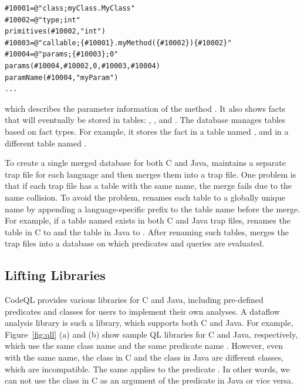 \begin{lstlisting}[style=java,numbers=none]
#10001=@"class;myClass.MyClass"
#10002=@"type;int"
primitives(#10002,"int")
#10003=@"callable;{#10001}.myMethod({#10002}){#10002}"
#10004=@"params;{#10003};0"
params(#10004,#10002,0,#10003,#10004)
paramName(#10004,"myParam")
...
\end{lstlisting}

\noindent
which describes the parameter information of the method .
It also shows facts that will eventually be stored in tables:
, , and
.  The database manages tables based on fact types.
For example, it stores the fact  in a table named
, and  in a different table named
.

To create a single merged database for both C and Java, \ours maintains a
separate trap file for each language and then merges them into a trap file.
One problem is that if each trap file has a table with the same name, the merge
fails due to the name collision.  To avoid the problem, \ours renames each
table to a globally unique name by appending a language-specific prefix to the
table name before the merge.  For example, if a table named 
exists in both C and Java trap files, \ours renames the table in C to
 and the table in Java to .  After
renaming such tables, \ours merges the trap files into a database on which
predicates and queries are evaluated.


\subsection{Lifting Libraries}

CodeQL provides various libraries for C and Java, including pre-defined
predicates and classes for users to implement their own analyses.  A dataflow
analysis library is such a library, which supports both C and Java.  For
example, Figure~\ref{fig:qll} (a) and (b) show sample QL libraries for C and
Java, respectively, which use the same class name  and the same
predicate name .  However, even with the same name, the
class  in C and the class  in Java are different
classes, which are incompatible.  The same applies to the predicate
.  In other words, we can not use the class 
in C as an argument of the predicate  in Java or vice
versa.

